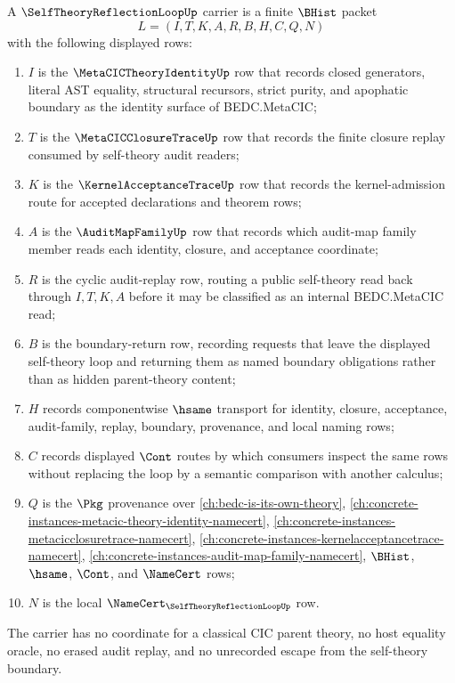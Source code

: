 \begin{definition}
\label{def:self-theory-reflection-loop-carrier}
A $\SelfTheoryReflectionLoopUp$ carrier is a finite $\BHist$ packet
$$
L=(I,T,K,A,R,B,H,C,Q,N)
$$
with the following displayed rows:
\begin{enumerate}
\item $I$ is the $\MetaCICTheoryIdentityUp$ row that records closed generators, literal AST equality, structural recursors, strict purity, and apophatic boundary as the identity surface of BEDC.MetaCIC;
\item $T$ is the $\MetaCICClosureTraceUp$ row that records the finite closure replay consumed by self-theory audit readers;
\item $K$ is the $\KernelAcceptanceTraceUp$ row that records the kernel-admission route for accepted declarations and theorem rows;
\item $A$ is the $\AuditMapFamilyUp$ row that records which audit-map family member reads each identity, closure, and acceptance coordinate;
\item $R$ is the cyclic audit-replay row, routing a public self-theory read back through $I,T,K,A$ before it may be classified as an internal BEDC.MetaCIC read;
\item $B$ is the boundary-return row, recording requests that leave the displayed self-theory loop and returning them as named boundary obligations rather than as hidden parent-theory content;
\item $H$ records componentwise $\hsame$ transport for identity, closure, acceptance, audit-family, replay, boundary, provenance, and local naming rows;
\item $C$ records displayed $\Cont$ routes by which consumers inspect the same rows without replacing the loop by a semantic comparison with another calculus;
\item $Q$ is the $\Pkg$ provenance over \autoref{ch:bedc-is-its-own-theory}, \autoref{ch:concrete-instances-metacic-theory-identity-namecert}, \autoref{ch:concrete-instances-metacicclosuretrace-namecert}, \autoref{ch:concrete-instances-kernelacceptancetrace-namecert}, \autoref{ch:concrete-instances-audit-map-family-namecert}, $\BHist$, $\hsame$, $\Cont$, and $\NameCert$ rows;
\item $N$ is the local $\NameCert_{\SelfTheoryReflectionLoopUp}$ row.
\end{enumerate}
The carrier has no coordinate for a classical CIC parent theory, no host equality oracle, no erased audit replay, and no unrecorded escape from the self-theory boundary.
\end{definition}

